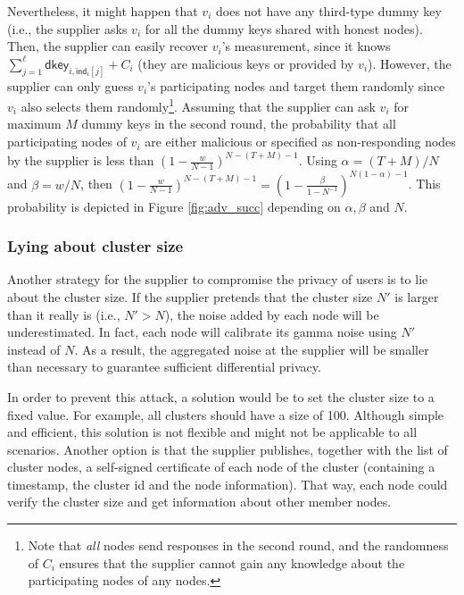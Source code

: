 \documentclass[11pt,a4paper]{article}
\theoremstyle{plain}
\theoremstyle{plain}
\theoremstyle{plain}
\theoremstyle{plain}
\theoremstyle{nonumberplain} \theoremseparator{}
\begin{document}
Nevertheless, it might happen that $v_i$ does not have any third-type dummy key (i.e., the supplier asks $v_i$ for all the dummy keys shared with honest nodes). Then, the supplier can easily recover $v_i$'s measurement, since it knows $\sum^\ell_{j=1} \mathsf{dkey}_{i,\mathsf{ind}_i[j]} + C_i$ (they are malicious keys or provided by $v_i$). However, the supplier can only guess $v_i$'s participating nodes and target them randomly since $v_i$ also selects them randomly\footnote{Note that \emph{all} nodes send responses in the second round, and the randomness of $C_i$ ensures that the supplier cannot gain any knowledge about the participating nodes of any nodes.}. 
Assuming that the supplier can ask $v_{i}$ for maximum $M$ dummy keys in the second round, the probability that all participating nodes of $v_i$ are either malicious or specified as non-responding nodes by the supplier is less than $(1-\frac{w}{N-1})^{N-(T+M)-1}$. Using $\alpha= (T+M)/N$ and $\beta=w/N$, then $(1-\frac{w}{N-1})^{N-(T+M)-1} = (1-\frac{\beta}{1-N^{-1}})^{N(1-\alpha)-1}$.  
This probability is depicted in Figure \ref{fig:adv_succ} depending on $\alpha, \beta$ and $N$.

\begin{figure*}[ht]
\centering
{}
\caption{Success probability of guessing participating nodes depending on $\beta$ and different values of $\alpha$ and $N$.}
\label{fig:adv_succ}
\end{figure*}
 


\subsubsection*{Lying about cluster size}


Another strategy for the supplier to compromise the privacy of users is to lie
about the cluster size. If the supplier pretends that the cluster
size $N'$ is larger than it really is (i.e., $N' > N$), the noise added by 
each node will be underestimated. In fact, each node will calibrate its 
gamma noise using $N'$ instead of $N$. As a result, the 
aggregated noise at the supplier will be smaller than necessary to 
guarantee sufficient differential privacy. 

In order to prevent this attack, a solution would be to set the cluster
size to a fixed value. For example, all clusters should have a size of 100.
Although simple and efficient, this solution is not flexible and might
not be applicable to all scenarios. Another option is that the supplier
publishes, together with the list of cluster nodes, a self-signed
certificate of each node of the cluster (containing a timestamp, the cluster id and the node 
information). That way, each node could verify 
the cluster size and get information about other member nodes.
\end{document}
